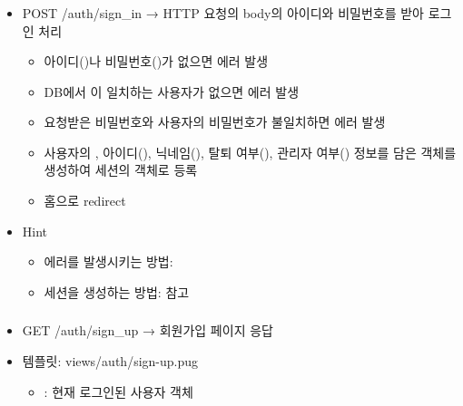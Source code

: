 \subsubsection*{}
\begin{itemize}
    \item POST /auth/sign\_in → HTTP 요청의 body의 아이디와 비밀번호를 받아 로그인 처리
    \begin{itemize}
        \item 아이디()나 비밀번호()가 없으면  에러 발생
        \item DB에서 이 일치하는 사용자가 없으면  에러 발생
        \item 요청받은 비밀번호와 사용자의 비밀번호가 불일치하면  에러 발생
        \item 사용자의 , 아이디(), 닉네임(), 탈퇴 여부(), 관리자 여부() 정보를 담은 객체를 생성하여 세션의  객체로 등록
        \item 홈으로 redirect
    \end{itemize}
    \item Hint
    \begin{itemize}
        \item {} 에러를 발생시키는 방법: 
        \item 세션을 생성하는 방법:  참고
    \end{itemize}
\end{itemize}

\subsubsection*{}
\begin{itemize}
    \item GET /auth/sign\_up → 회원가입 페이지 응답
    \item 템플릿: views/auth/sign-up.pug
    \begin{itemize}
        \item {}: 현재 로그인된 사용자 객체
    \end{itemize}
\end{itemize}

